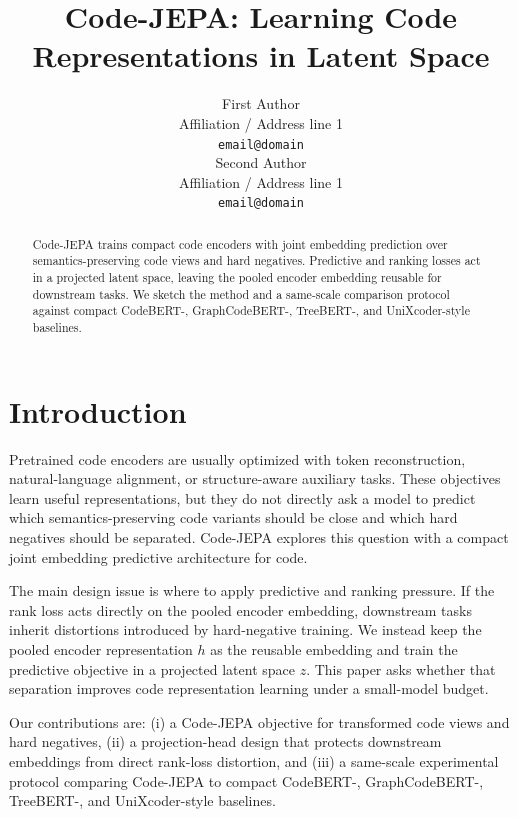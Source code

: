 \documentclass[11pt]{article}
\title{Code-JEPA: Learning Code Representations in Latent Space}
\author{First Author \\
  Affiliation / Address line 1 \\
  \texttt{email@domain} \\\And
  Second Author \\
  Affiliation / Address line 1 \\
  \texttt{email@domain} \\}
\begin{document}
\maketitle

\begin{abstract}
Code-JEPA trains compact code encoders with joint embedding prediction over
semantics-preserving code views and hard negatives. Predictive and ranking losses
act in a projected latent space, leaving the pooled encoder embedding reusable
for downstream tasks. We sketch the method and a same-scale comparison protocol
against compact CodeBERT-, GraphCodeBERT-, TreeBERT-, and UniXcoder-style
baselines.
\end{abstract}

\section{Introduction}

Pretrained code encoders are usually optimized with token reconstruction,
natural-language alignment, or structure-aware auxiliary tasks. These objectives
learn useful representations, but they do not directly ask a model to predict
which semantics-preserving code variants should be close and which hard
negatives should be separated. Code-JEPA explores this question with a compact
joint embedding predictive architecture for code.

The main design issue is where to apply predictive and ranking pressure. If the
rank loss acts directly on the pooled encoder embedding, downstream tasks inherit
distortions introduced by hard-negative training. We instead keep the pooled
encoder representation \(h\) as the reusable embedding and train the predictive
objective in a projected latent space \(z\). This paper asks whether that
separation improves code representation learning under a small-model budget.

Our contributions are: (i) a Code-JEPA objective for transformed code views and
hard negatives, (ii) a projection-head design that protects downstream
embeddings from direct rank-loss distortion, and (iii) a same-scale experimental
protocol comparing Code-JEPA to compact CodeBERT-, GraphCodeBERT-, TreeBERT-,
and UniXcoder-style baselines.
\end{document}
